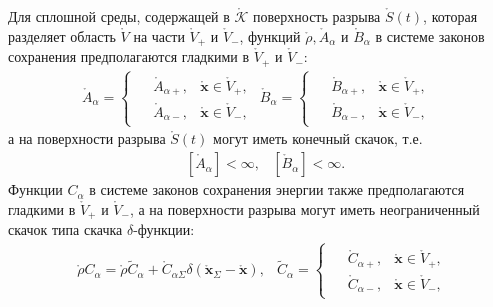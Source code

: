 \begin{axiom}\label{ax17}
	Для сплошной среды, содержащей в $\mathring{\mathcal{K}}$ поверхность разрыва $\mathring{S}(t)$, которая разделяет область $\mathring{V}$ на части $\mathring{V}_+$ и $\mathring{V}_-$, функций $\mathring{\rho}, \mathring{A}_\alpha$ и $\mathring{B}_\alpha$ в системе законов сохранения предполагаются гладкими в $\mathring{V}_+$ и $\mathring{V}_-$:
	\[
	\begin{aligned}
		\mathring{A}_\alpha=\begin{cases}
			\begin{aligned}
				&\mathring{A}_{\alpha+},&\mathring{\mathbf{x}}\in\mathring{V}_+,\\
				&\mathring{A}_{\alpha-},&\mathring{\mathbf{x}}\in\mathring{V}_-,
			\end{aligned}
		\end{cases}
		\mathring{B}_\alpha=\begin{cases}
			\begin{aligned}
				&\mathring{B}_{\alpha+},&\mathring{\mathbf{x}}\in\mathring{V}_+,\\
				&\mathring{B}_{\alpha-},&\mathring{\mathbf{x}}\in\mathring{V}_-,
			\end{aligned}
		\end{cases}
	\end{aligned}
	\]
	а на поверхности разрыва $\mathring{S}(t)$ могут иметь конечный скачок, т.е.
	\[
	\begin{aligned}
		&[\mathring{A}_\alpha] < \infty,&	[\mathring{B}_\alpha] < \infty.
	\end{aligned}
	\]
	Функции $C_\alpha$ в системе законов сохранения энергии также предполагаются гладкими в $\mathring{V}_+$ и $\mathring{V}_-$, а на поверхности разрыва могут иметь неограниченный скачок типа скачка $\delta$-функции:
	\begin{equation}\label{eq17}
	\begin{aligned}
		&\mathring{\rho}C_\alpha=\mathring{\rho}\tilde{C}_\alpha+\mathring{C}_{\alpha\Sigma}\delta(\mathring{\mathbf{x}}_\Sigma-\mathring{\mathbf{x}}),&\tilde{C}_\alpha=\begin{cases}
			\begin{aligned}
				&\mathring{C}_{\alpha+},&\mathring{\mathbf{x}}\in\mathring{V}_+,\\
				&\mathring{C}_{\alpha-},&\mathring{\mathbf{x}}\in\mathring{V}_-,
			\end{aligned}
		\end{cases}
	\end{aligned}

\end{equation}
\end{axiom}
